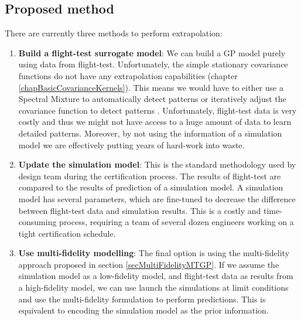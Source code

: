 
\subsection{Proposed method}
There are currently three methods to perform extrapolation:
\begin{enumerate}
\item \textbf{Build a flight-test surrogate model}: We can build a GP model purely using data from flight-test. Unfortunately, the simple stationary covariance functions do not have any extrapolation capabilities (chapter \ref{chapBasicCovarianceKernels}). This means we would have to either use a Spectral Mixture to automatically detect patterns \cite{wilson2014thesis} or iteratively adjust the covariance function to detect patterns \cite{duvenaud-thesis-2014}. Unfortunately, flight-test data is very costly and thus we might not have access to a huge amount of data to learn detailed patterns. Moreover, by not using the information of a simulation model we are effectively putting years of hard-work into waste. 

\item \textbf{Update the simulation model}: This is the standard methodology used by design team during the certification process. The results of flight-test are compared to the results of prediction of a simulation model. A simulation model has several parameters, which are fine-tuned to decrease the difference between flight-test data and simulation results. This is a costly and time-consuming process, requiring a team of several dozen engineers working on a tight certification schedule. 

\item \textbf{Use multi-fidelity modelling}: The final option is using the multi-fidelity approach proposed in section \ref{secMultiFidelityMTGP}. If we assume the simulation model as a low-fidelity model, and flight-test data as results from a high-fidelity model, we can use launch the simulations at limit conditions and use the multi-fidelity formulation to perform predictions. This is equivalent to encoding the simulation model as the prior information. 
\end{enumerate}

